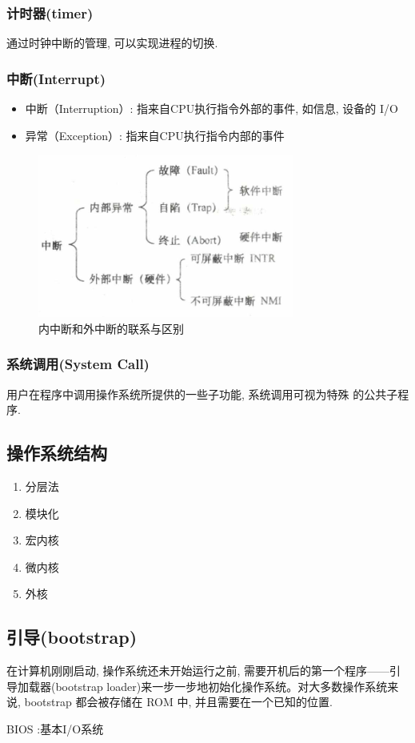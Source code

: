 \subsubsection{计时器(timer)}
通过时钟中断的管理, 可以实现进程的切换. 

\subsubsection{中断(Interrupt)}
\begin{itemize}
    \item 中断（Interruption）: 指来自CPU执行指令外部的事件, 如信息, 设备的 I/O
    \item 异常（Exception）: 指来自CPU执行指令内部的事件
\end{itemize}

\begin{figure}[H]
    \centering
    \includegraphics[width=0.618\linewidth]{pic/OS-CheatSheet/内中断和外中断的联系与区别}
    \caption{内中断和外中断的联系与区别}
\end{figure}


\subsubsection{系统调用(System Call)}
用户在程序中调用操作系统所提供的一些子功能, 系统调用可视为特殊
的公共子程序. 

\subsection{操作系统结构}
\begin{enumerate}
    \item 分层法
    \item 模块化
    \item 宏内核
    \item 微内核
    \item 外核
\end{enumerate}

\subsection{引导(bootstrap)}
在计算机刚刚启动, 操作系统还未开始运行之前, 需要开机后的第一个程序——引导加载器(bootstrap loader)来一步一步地初始化操作系统。对大多数操作系统来说, bootstrap 都会被存储在 ROM 中, 并且需要在一个已知的位置. 

BIOS :基本I/O系统